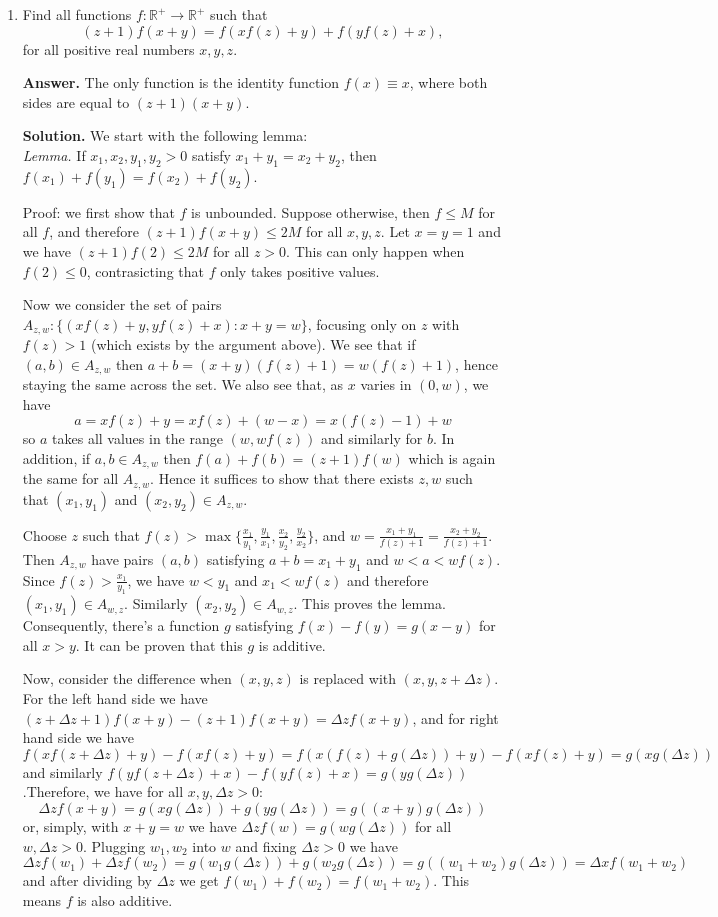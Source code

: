 \documentclass[11pt,a4paper]{article}
\begin{document}
\begin{enumerate}
	\item Find all functions $f: \mathbb{R}^+ \to \mathbb{R}^+$ such that
	$$(z + 1)f(x + y) = f(xf(z) + y) + f(yf(z) + x),$$for all positive real numbers $x, y, z$.
	
	\textbf{Answer.} The only function is the identity function $f(x)\equiv x$, where both sides are equal to $(z+1)(x+y)$. 
	
	\textbf{Solution.} We start with the following lemma: \\
	\emph{Lemma.} If $x_1, x_2, y_1, y_2>0$ satisfy $x_1+y_1=x_2+y_2$, then $f(x_1)+f(y_1)=f(x_2)+f(y_2)$. 
	
	Proof: we first show that $f$ is unbounded. Suppose otherwise, then $f\le M$ for all $f$, and therefore $(z+1)f(x+y)\le 2M$ for all $x, y, z$. Let $x=y=1$ and we have $(z+1)f(2)\le 2M$ for all $z>0$. This can only happen when $f(2)\le 0$, contrasicting that $f$ only takes positive values. 
	
	Now we consider the set of pairs $A_{z, w}: \{(xf(z)+y, yf(z)+x): x+y=w\}$, focusing only on $z$ with $f(z)>1$ (which exists by the argument above). We see that if $(a, b)\in A_{z, w}$ then $a+b=(x+y)(f(z)+1)=w(f(z)+1)$, hence staying the same across the set. We also see that, as $x$ varies in $(0, w)$, we have 
	\[
	a=xf(z)+y=xf(z)+(w-x)=x(f(z)-1)+w
	\]
	so $a$ takes all values in the range $(w, wf(z))$ and similarly for $b$. In addition, if $a, b\in A_{z, w}$ then $f(a)+f(b)=(z+1)f(w)$ which is again the same for all $A_{z, w}$. Hence it suffices to show that there exists $z, w$ such that $(x_1, y_1)$ and $(x_2, y_2)\in A_{z, w}$.	
	
	Choose $z$ such that $f(z)>\max\{\frac{x_1}{y_1}, \frac{y_1}{x_1}, \frac{x_2}{y_2}, \frac{y_2}{x_2}\}$, and $w=\frac{x_1+y_1}{f(z)+1}=\frac{x_2+y_2}{f(z)+1}$. Then $A_{z, w}$ have pairs $(a, b)$ satisfying $a+b=x_1+y_1$ and $w<a<wf(z)$. Since $f(z)>\frac{x_1}{y_1}$, we have $w<y_1$ and $x_1<wf(z)$ and therefore $(x_1, y_1)\in A_{w, z}$. Similarly $(x_2, y_2)\in A_{w, z}$. This proves the lemma. Consequently, there's a function $g$ satisfying $f(x)-f(y)=g(x-y)$ for all $x>y$. It can be proven that this $g$ is additive. 
	
	Now, consider the difference when $(x, y, z)$ is replaced with $(x, y, z+\Delta z)$. For the left hand side we have $(z+\Delta z + 1)f(x+y)-(z+1)f(x+y)=\Delta z f(x + y)$, and for right hand side we have 
	\[
	f(xf(z+\Delta z) + y) - f(xf(z)+y) = f(x(f(z)+ g(\Delta z)) + y) - f(xf(z) + y) = g(xg(\Delta z))
	\]
	and similarly $f(yf(z+\Delta z) + x) - f(yf(z)+x) = g(yg(\Delta z))$.Therefore, we have for all $x, y, \Delta z> 0$: 
	\[
	\Delta z f(x + y) = g(xg(\Delta z)) + g(yg(\Delta z)) = g((x+y)g(\Delta z))
	\] 
	or, simply, with $x+y=w$ we have $\Delta z f(w)=g(wg(\Delta z))$ for all $w, \Delta z > 0$. Plugging $w_1, w_2$ into $w$ and fixing $\Delta z > 0$ we have 
	\[
	\Delta z f(w_1)+ \Delta z f(w_2) = g(w_1g(\Delta z)) + g(w_2g(\Delta z)) = g((w_1+w_2)g(\Delta z)) = \Delta x f(w_1+w_2)
	\]
	and after dividing by $\Delta z$ we get $f(w_1)+f(w_2)=f(w_1+w_2)$. This means $f$ is also additive. 
	

\end{enumerate}
\end{document}
